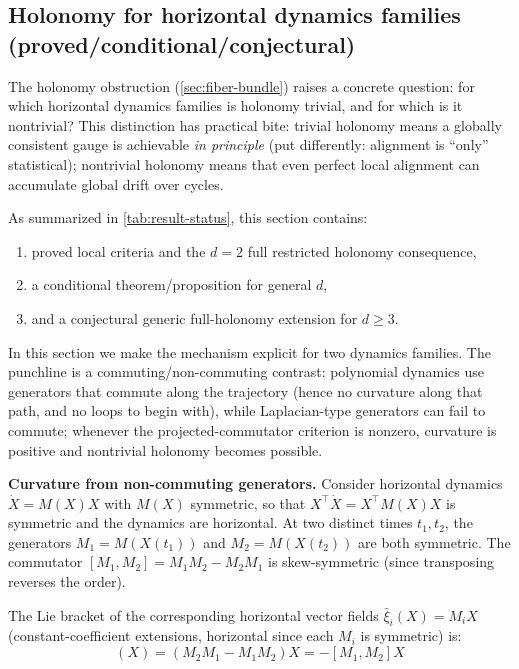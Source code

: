 \documentclass{article}
\theoremstyle{plain}
\theoremstyle{definition}
\theoremstyle{remark}
\begin{document}
\subsection{Holonomy for horizontal dynamics families (proved/conditional/conjectural)}\label{sec:holonomy-dynamics}

The holonomy obstruction (\cref{sec:fiber-bundle}) raises a concrete question: for which horizontal dynamics families is holonomy trivial, and for which is it nontrivial?
This distinction has practical bite: trivial holonomy means a globally consistent gauge is achievable \emph{in principle} (put differently: alignment is ``only'' statistical); nontrivial holonomy means that even perfect local alignment can accumulate global drift over cycles.

As summarized in \cref{tab:result-status}, this section contains:
\begin{enumerate}
\item proved local criteria and the $d = 2$ full restricted holonomy consequence,
\item a conditional theorem/proposition for general $d$,
\item and a conjectural generic full-holonomy extension for $d \ge 3$.
\end{enumerate}

In this section we make the mechanism explicit for two dynamics families.
The punchline is a commuting/non-commuting contrast:
polynomial dynamics use generators that commute along the trajectory (hence no curvature along that path, and no loops to begin with), while Laplacian-type generators can fail to commute; whenever the projected-commutator criterion is nonzero, curvature is positive and nontrivial holonomy becomes possible.

\textbf{Curvature from non-commuting generators.}
Consider horizontal dynamics $\dot{X} = M(X) X$ with $M(X)$ symmetric, so that $X^\top \dot{X} = X^\top M(X) X$ is symmetric and the dynamics are horizontal.
At two distinct times $t_1, t_2$, the generators $M_1 = M(X(t_1))$ and $M_2 = M(X(t_2))$ are both symmetric.
The commutator $[M_1, M_2] = M_1 M_2 - M_2 M_1$ is skew-symmetric (since transposing reverses the order).

The Lie bracket of the corresponding horizontal vector fields $\bar{\xi}_i(X) = M_i X$ (constant-coefficient extensions, horizontal since each $M_i$ is symmetric) is:
\begin{equation}
[\bar{\xi}_1, \bar{\xi}_2](X) = (M_2 M_1 - M_1 M_2) X = -[M_1, M_2] X
\end{equation}
\end{document}
